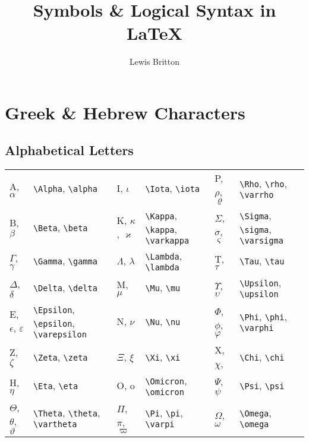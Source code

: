 \documentclass[10pt, english]{article}
\begin{document}

	\title{Symbols \& Logical Syntax in {\LaTeX}}
	\author{Lewis Britton}
	\date{}
	\maketitle

\section{Greek \& Hebrew Characters}

	\subsection{Alphabetical Letters}

	\begin{center}
		\scriptsize
	\begin{tabular}{ll|ll|ll}
		A, $\alpha$ & \verb|\Alpha|, \verb|\alpha| & I, $\iota$ & \verb|\Iota|, \verb|\iota| & P, $\rho$, $\varrho$ & \verb|\Rho|, \verb|\rho|, \verb|\varrho| \\
		B, $\beta$ & \verb|\Beta|, \verb|\beta| & K, $\kappa$, $\varkappa$ & \verb|\Kappa|, \verb|\kappa|, \verb|\varkappa| & $\Sigma$, $\sigma$, $\varsigma$ & \verb|\Sigma|, \verb|\sigma|, \verb|\varsigma| \\
		$\Gamma$, $\gamma$ & \verb|\Gamma|, \verb|\gamma| & $\Lambda$, $\lambda$ & \verb|\Lambda|, \verb|\lambda| & T, $\tau$ & \verb|\Tau|, \verb|\tau| \\
		$\Delta$, $\delta$ & \verb|\Delta|, \verb|\delta| & M, $\mu$ & \verb|\Mu|, \verb|\mu| & $\Upsilon$, $\upsilon$ & \verb|\Upsilon|, \verb|\upsilon| \\
		E, $\epsilon$, $\varepsilon$ & \verb|\Epsilon|, \verb|\epsilon|, \verb|\varepsilon| & N, $\nu$ & \verb|\Nu|, \verb|\nu| & $\Phi$, $\phi$, $\varphi$ & \verb|\Phi|, \verb|\phi|, \verb|\varphi| \\
		Z, $\zeta$ & \verb|\Zeta|, \verb|\zeta| & $\Xi$, $\xi$ & \verb|\Xi|, \verb|\xi| & X, $\chi$, & \verb|\Chi|, \verb|\chi| \\
		H, $\eta$ & \verb|\Eta|, \verb|\eta| & O, o & \verb|\Omicron|, \verb|\omicron| & $\Psi$, $\psi$ & \verb|\Psi|, \verb|\psi| \\
		$\Theta$, $\theta$, $\vartheta$ & \verb|\Theta|, \verb|\theta|, \verb|\vartheta| & $\Pi$, $\pi$, $\varpi$ & \verb|\Pi|, \verb|\pi|, \verb|\varpi| & $\Omega$, $\omega$ & \verb|\Omega|, \verb|\omega| \\
	\end{tabular}
	\end{center}
\end{document}
